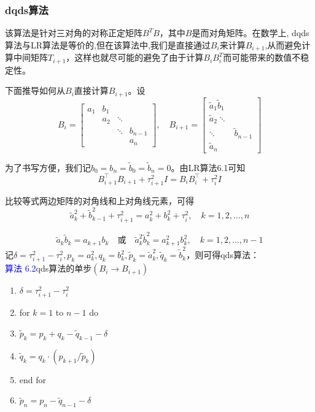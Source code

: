 \documentclass[notheorems,serif]{beamer}
\begin{document}
\begin{frame}
\frametitle{dqds算法}


该算法是针对三对角的对称正定矩阵$B^TB$，其中$B$是而对角矩阵。在数学上, dqds算法与LR算法是等价的,但在该算法中,我们是直接通过$B_i$来计算$B_{i+1}$,从而避免计算中间矩阵$T_{i+1}$，这样也就尽可能的避免了由于计算$B_iB_i^T$而可能带来的数值不稳定性。

下面推导如何从$B_i$直接计算$B_{i+1}$。设
$$
B_{i}=\left[\begin{array}{cccc}{a_{1}} & {b_{1}} & {} & {} \\ {} & {a_{2}} & {\ddots} & {} \\ {} & {} & {\ddots} & {b_{n-1}} \\ {} & {} & {} & {a_{n}}\end{array}\right], \quad B_{i+1}=\left[\begin{array}{cccc}{\tilde{a}_{1} \tilde{b}_{1}} \\ {\tilde{a}_{2} \ddots} \\ {\ddots} & {\tilde{b}_{n-1}} \\ {\tilde{a}_{n}}\end{array}\right]
$$

为了书写方便，我们记$b_{0}=b_{n}=\tilde{b}_{0}=\tilde{b}_{n}=0$。由LR算法6.1可知
$$
B_{i+1}^{\top} B_{i+1}+\tau_{i+1}^{2} I=B_{i} B_{i}^{\top}+\tau_{i}^{2} I
$$
\end{frame}
\begin{frame}

比较等式两边矩阵的对角线和上对角线元素，可得
$$
\tilde{a}_{k}^{2}+\tilde{b}_{k-1}^{2}+\tau_{i+1}^{2}=a_{k}^{2}+b_{k}^{2}+\tau_{i}^{2}, \quad k=1,2, \ldots, n
$$

$$
\tilde{a}_{k} \tilde{b}_{k}=a_{k+1} b_{k} \quad \text {或} \quad \tilde{a}_{k}^{2} \tilde{b}_{k}^{2}=a_{k+1}^{2} b_{k}^{2}, \quad k=1,2, \ldots, n-1
$$
记$\delta=\tau_{i+1}^{2}-\tau_{i}^{2}, p_{k}=a_{k}^{2}, q_{k}=b_{k}^{2}, \tilde{p}_{k}=\tilde{a}_{k}^{2}, \tilde{q}_{k}=\tilde{b}_{k}^{2}$，则可得qds算法：\\
\textcolor{blue}{算法 6.2}\quad qds算法的单步$\left(B_{i} \rightarrow B_{i+1}\right)$
\begin{enumerate}[1:]
	\item $\delta=\tau_{i+1}^{2}-\tau_{i}^{2}$
	\item for $k=1$ to $n-1$ do
	\item \quad $\tilde{p}_{k}=p_{k}+q_{k}-\tilde{q}_{k-1}-\delta$
	\item $\tilde{q}_{k}=q_{k} \cdot\left(p_{k+1} / \tilde{p}_{k}\right)$
	\item end for 
	\item $\tilde{p}_{n}=p_{n}-\tilde{q}_{n-1}-\delta$
\end{enumerate}
\end{frame}
\end{document}
